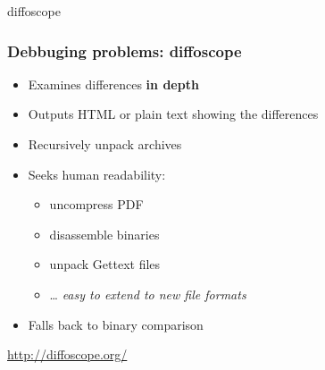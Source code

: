 \documentclass[14pt,aspectratio=169]{beamer}
\begin{document}
{
\begin{frame}{diffoscope}
 \frametitle{Debbuging problems: diffoscope}

 \begin{itemize}
  \item Examines differences \textbf{in depth}
  \item Outputs HTML or plain text showing the differences
  \item Recursively unpack archives
  \item Seeks human readability:
   \begin{itemize}
    \item uncompress PDF
    \item disassemble binaries
    \item unpack Gettext files
    \item … \textit{easy to extend to new file formats}
   \end{itemize}
  \item Falls back to binary comparison
 \end{itemize}
 \vfill
 \begin{center}
  \url{http://diffoscope.org/}
 \end{center}
\end{frame}
}
\end{document}
